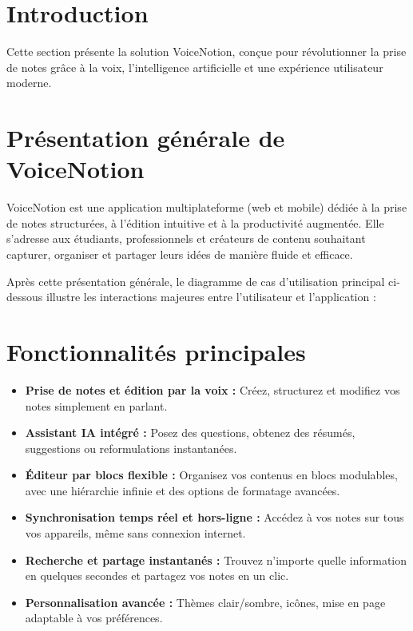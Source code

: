 
\section*{Introduction}
Cette section présente la solution VoiceNotion, conçue pour révolutionner la prise de notes grâce à la voix, l’intelligence artificielle et une expérience utilisateur moderne.

\section{Présentation générale de VoiceNotion}
VoiceNotion est une application multiplateforme (web et mobile) dédiée à la prise de notes structurées, à l’édition intuitive et à la productivité augmentée. Elle s’adresse aux étudiants, professionnels et créateurs de contenu souhaitant capturer, organiser et partager leurs idées de manière fluide et efficace.

Après cette présentation générale, le diagramme de cas d’utilisation principal ci-dessous illustre les interactions majeures entre l’utilisateur et l’application :

\section{Fonctionnalités principales}
\begin{itemize}
    \item \textbf{Prise de notes et édition par la voix :} Créez, structurez et modifiez vos notes simplement en parlant.
    \item \textbf{Assistant IA intégré :} Posez des questions, obtenez des résumés, suggestions ou reformulations instantanées.
    \item \textbf{Éditeur par blocs flexible :} Organisez vos contenus en blocs modulables, avec une hiérarchie infinie et des options de formatage avancées.
    \item \textbf{Synchronisation temps réel et hors-ligne :} Accédez à vos notes sur tous vos appareils, même sans connexion internet.
    \item \textbf{Recherche et partage instantanés :} Trouvez n’importe quelle information en quelques secondes et partagez vos notes en un clic.
    \item \textbf{Personnalisation avancée :} Thèmes clair/sombre, icônes, mise en page adaptable à vos préférences.
\end{itemize}

